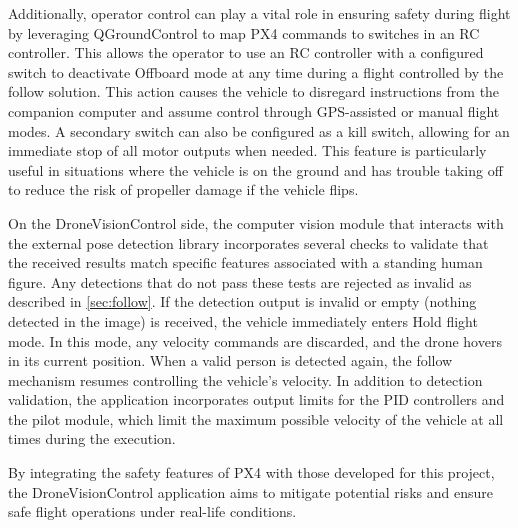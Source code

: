 Additionally, operator control can play a vital role in ensuring safety during flight by leveraging QGroundControl to map PX4 commands to switches in an RC controller. This allows the operator to use an RC controller with a configured switch to deactivate Offboard mode at any time during a flight controlled by the follow solution. This action causes the vehicle to disregard instructions from the companion computer and assume control through GPS-assisted or manual flight modes. A secondary switch can also be configured as a kill switch, allowing for an immediate stop of all motor outputs when needed. This feature is particularly useful in situations where the vehicle is on the ground and has trouble taking off to reduce the risk of propeller damage if the vehicle flips.

On the DroneVisionControl side, the computer vision module that interacts with the external pose detection library incorporates several checks to validate that the received results match specific features associated with a standing human figure. Any detections that do not pass these tests are rejected as invalid as described in \ref{sec:follow}. If the detection output is invalid or empty (nothing detected in the image) is received, the vehicle immediately enters Hold flight mode. In this mode, any velocity commands are discarded, and the drone hovers in its current position. When a valid person is detected again, the follow mechanism resumes controlling the vehicle's velocity. In addition to detection validation, the application incorporates output limits for the PID controllers and the pilot module, which limit the maximum possible velocity of the vehicle at all times during the execution.


By integrating the safety features of PX4 with those developed for this project, the DroneVisionControl application aims to mitigate potential risks and ensure safe flight operations under real-life conditions.
